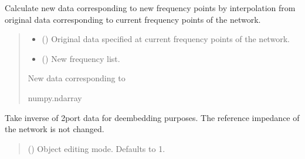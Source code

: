 \documentclass[letterpaper,10pt,english]{sphinxmanual}
\begin{document}
\begin{fulllineitems}
\begin{fulllineitems}
\label{\detokenize{touchstone:touchstone.spfile.interpolate_data}}
\pysigstartsignatures
{}
\pysigstopsignatures
\sphinxAtStartPar
Calculate new data corresponding to new frequency points  by interpolation from original data corresponding to current frequency points of the network.
\begin{quote}\begin{description}
\begin{itemize}
\item {}
\sphinxAtStartPar
{} () \textendash{} Original data specified at current frequency points of the network.

\item {}
\sphinxAtStartPar
{} () \textendash{} New frequency list.

\end{itemize}

\sphinxAtStartPar
New data corresponding to 

\sphinxAtStartPar
numpy.ndarray

\end{description}\end{quote}

\end{fulllineitems}


\begin{fulllineitems}
\label{\detokenize{touchstone:touchstone.spfile.inverse_2port}}
\pysigstartsignatures
{}
\pysigstopsignatures
\sphinxAtStartPar
Take inverse of 2\sphinxhyphen{}port data for de\sphinxhyphen{}embedding purposes. The reference impedance of the network is not changed.
\begin{quote}\begin{description}
\sphinxAtStartPar
{} (\sphinxstyleliteralemphasis{\sphinxupquote{, }}) \textendash{} Object editing mode. Defaults to \sphinxhyphen{}1.


\end{description}
\end{quote}
\end{fulllineitems}
\end{fulllineitems}
\end{document}

